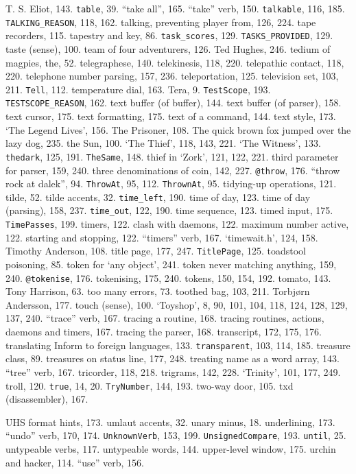 T. S. Eliot, 143.
{{\tt table}}, 39.
``take all'', 165.
``take'' verb, 150.
{{\tt talkable}}, 116, 185.
{{\tt TALKING\_REASON}}, 118, 162.
talking, preventing player from, 126, 224.
tape recorders, 115.
tapestry and key, 86.
{{\tt task\_scores}}, 129.
{{\tt TASKS\_PROVIDED}}, 129.
taste (sense), 100.
team of four adventurers, 126.
Ted Hughes, 246.
tedium of magpies, the, 52.
telegraphese, 140.
telekinesis, 118, 220.
telepathic contact, 118, 220.
telephone number parsing, 157, 236.
teleportation, 125.
television set, 103, 211.
{{\tt Tell}}, 112.
temperature dial, 163.
Tera, 9.
{{\tt TestScope}}, 193.
{{\tt TESTSCOPE\_REASON}}, 162.
text buffer (of buffer), 144.
text buffer (of parser), 158.
text cursor, 175.
text formatting, 175.
text of a command, 144.
text style, 173.
`The Legend Lives', 156.
The Prisoner, 108.
The quick brown fox jumped over the lazy dog, 235.
the Sun, 100.
`The Thief', 118, 143, 221.
`The Witness', 133.
{{\tt thedark}}, 125, 191.
{{\tt TheSame}}, 148.
thief in `Zork', 121, 122, 221.
third parameter for parser, 159, 240.
three denominations of coin, 142, 227.
{{\tt @throw}}, 176.
``throw rock at dalek'', 94.
{{\tt ThrowAt}}, 95, 112.
{{\tt ThrownAt}}, 95.
tidying-up operations, 121.
tilde, 52.
tilde accents, 32.
{{\tt time\_left}}, 190.
time of day, 123.
time of day (parsing), 158, 237.
{{\tt time\_out}}, 122, 190.
time sequence, 123.
timed input, 175.
{{\tt TimePasses}}, 199.
timers, 122.
\quad  clash with daemons, 122.
\quad  maximum number active, 122.
\quad  starting and stopping, 122.
``timers'' verb, 167.
`timewait.h', 124, 158.
Timothy Anderson, 108.
title page, 177, 247.
{{\tt TitlePage}}, 125.
toadstool poisoning, 85.
token for `any object', 241.
token never matching anything, 159, 240.
{{\tt @tokenise}}, 176.
tokenising, 175, 240.
tokens, 150, 154, 192.
tomato, 143.
Tony Harrison, 63.
too many errors, 73.
toothed bag, 103, 211.
Torbj\o rn Andersson, 177.
touch (sense), 100.
`Toyshop', 8, 90, 101, 104, 118, 124, 128, 129, 137, 240.
``trace'' verb, 167.
tracing a routine, 168.
tracing routines, actions, daemons and timers, 167.
tracing the parser, 168.
transcript, 172, 175, 176.
translating Inform to foreign languages, 133.
{{\tt transparent}}, 103, 114, 185.
treasure class, 89.
treasures on status line, 177, 248.
treating {\fam \ttfam \tentt name} as a word array, 143.
``tree'' verb, 167.
tricorder, 118, 218.
trigrams, 142, 228.
`Trinity', 101, 177, 249.
troll, 120.
{{\tt true}}, 14, 20.
{{\tt TryNumber}}, 144, 193.
two-way door, 105.
txd (disassembler), 167.

UHS format hints, 173.
umlaut accents, 32.
unary minus, 18.
underlining, 173.
``undo'' verb, 170, 174.
{{\tt UnknownVerb}}, 153, 199.
{{\tt UnsignedCompare}}, 193.
{{\tt until}}, 25.
untypeable verbs, 117.
untypeable words, 144.
upper-level window, 175.
urchin and hacker, 114.
``use'' verb, 156.

